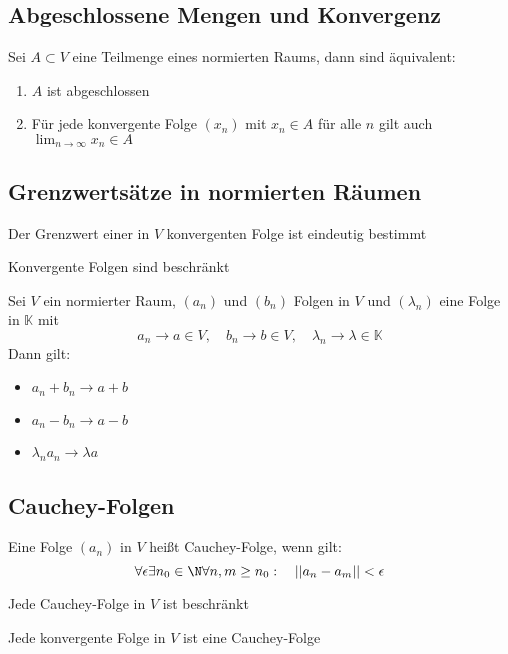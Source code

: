 	\subsection{Abgeschlossene Mengen und Konvergenz}
		\begin{Satz} [ ]
			Sei $A\subset V$ eine Teilmenge eines normierten Raums, dann sind äquivalent:
			\begin{enumerate}
				\item $A$ ist abgeschlossen
				\item Für jede konvergente Folge $(x_n)$ mit $x_n \in A$ für alle $n$ gilt auch $\lim_{n\to\infty}x_n \in A$
			\end{enumerate}
		\end{Satz}
	\subsection{Grenzwertsätze in normierten Räumen}
		\begin{Satz} [ ]
			Der Grenzwert einer in $V$ konvergenten Folge ist eindeutig bestimmt
		\end{Satz}
		\begin{Satz} [ ]
			Konvergente Folgen sind beschränkt
		\end{Satz}
		\begin{Satz} [ ]
			Sei $V$ ein normierter Raum, $(a_n)$ und $(b_n)$ Folgen in $V$ und $(\lambda_n)$ eine Folge in $\mathbb{K}$ mit 
			$$
				a_n\to a\in V, \quad b_n\to b \in V, \quad \lambda_n \to \lambda \in \mathbb{K}
			$$ 
			Dann gilt:
			\begin{itemize}
				\item $a_n + b_n \to a + b$
				\item $a_n - b_n \to a - b$
				\item $\lambda_n a_n \to \lambda a$
			\end{itemize}
		\end{Satz}
	\subsection{Cauchey-Folgen}
		\begin{Definition} 
			Eine Folge $(a_n)$ in $V$ heißt Cauchey-Folge, wenn gilt:
			$$
				\forall \epsilon \exists n_0 \in \N \forall n, m \geq n_0: \quad ||a_n - a_m|| < \epsilon
			$$
		\end{Definition}
		\begin{Satz} [ ]
			Jede Cauchey-Folge in $V$ ist beschränkt
		\end{Satz}
		\begin{Satz} [ ]
			Jede konvergente Folge in $V$ ist eine Cauchey-Folge
		\end{Satz}
